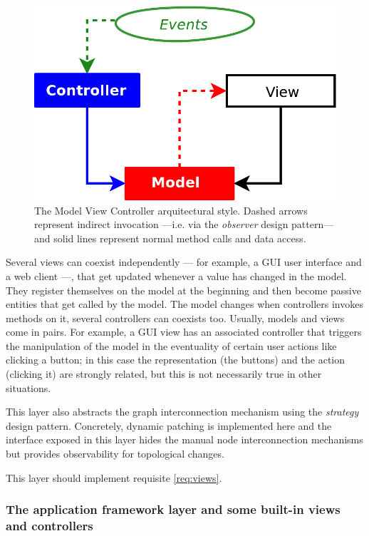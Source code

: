 \begin{figure}[h!] \centering
\includegraphics[width=.7\textwidth]{pic/mvc.pdf}

\caption[The MVC architectural style]{The Model View Controller
  arquitectural style. Dashed arrows represent indirect invocation
  ---i.e. via the \emph{observer} design pattern--- and solid lines
  represent normal method calls and data access.}
\label{fig:mvc}
\end{figure}

Several views can coexist independently --- for
example, a GUI user interface and a web client ---, that get updated
whenever a value has changed in the model. They register themselves on
the model at the beginning and then become passive entities that get
called by the model. The model changes when controllers invokes
methods on it, several controllers can
coexists too. Usually, models and views come in pairs. For example, a
GUI view has an associated controller that triggers the manipulation
of the model in the eventuality of certain user actions like clicking
a button; in this case the representation (the buttons) and the action
(clicking it) are strongly related, but this is not necessarily true
in other situations.

This layer also abstracts the graph interconnection mechanism using
the \emph{strategy} design pattern. Concretely, dynamic patching is implemented here and the
interface exposed in this layer hides the manual node interconnection
mechanisms but provides observability for topological changes.

This layer should implement requisite \ref{req:views}. 

\subsubsection{The application framework layer and some built-in views
  and controllers}


